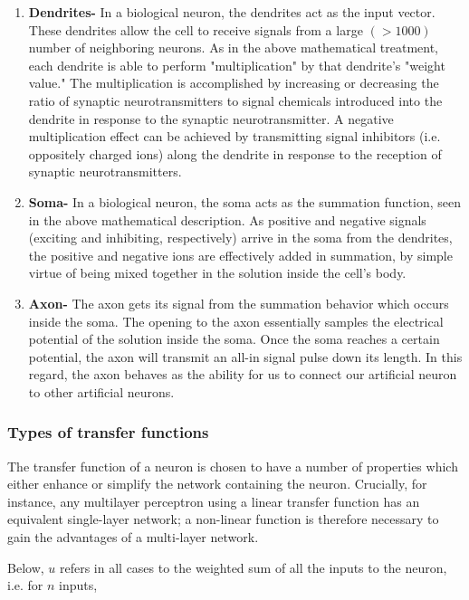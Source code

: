 \documentclass[14pt,a4paper]{extarticle}
\begin{document}
	\begin{enumerate}
		\item \textbf{Dendrites-} In a biological neuron, the dendrites act as the input vector. These dendrites allow the cell to receive signals from a large $(>1000)$ number of neighboring neurons. As in the above mathematical treatment, each dendrite is able to perform "multiplication" by that dendrite's "weight value." The multiplication is accomplished by increasing or decreasing the ratio of synaptic neurotransmitters to signal chemicals introduced into the dendrite in response to the synaptic neurotransmitter. A negative multiplication effect can be achieved by transmitting signal inhibitors (i.e. oppositely charged ions) along the dendrite in response to the reception of synaptic neurotransmitters.
		
		\item \textbf{Soma-}  In a biological neuron, the soma acts as the summation function, seen in the above mathematical description. As positive and negative signals (exciting and inhibiting, respectively) arrive in the soma from the dendrites, the positive and negative ions are effectively added in summation, by simple virtue of being mixed together in the solution inside the cell's body.
		
		\item \textbf{Axon-} The axon gets its signal from the summation behavior which occurs inside the soma. The opening to the axon essentially samples the electrical potential of the solution inside the soma. Once the soma reaches a certain potential, the axon will transmit an all-in signal pulse down its length. In this regard, the axon behaves as the ability for us to connect our artificial neuron to other artificial neurons.
		
	\end{enumerate}
	
	
	\subsubsection{Types of transfer functions}
	
	The transfer function of a neuron is chosen to have a number of properties which either enhance or simplify the network containing the neuron. Crucially, for instance, any multilayer perceptron using a linear transfer function has an equivalent single-layer network; a non-linear function is therefore necessary to gain the advantages of a multi-layer network.

Below, $u$ refers in all cases to the weighted sum of all the inputs to the neuron, i.e. for $n$ inputs,
\end{document}
